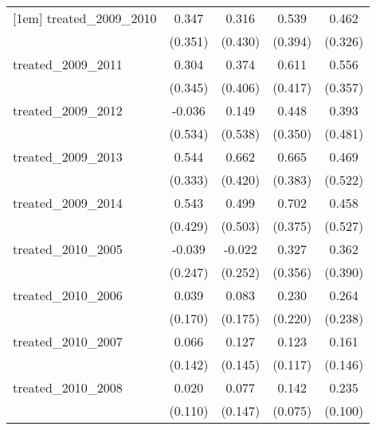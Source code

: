 {\begin{tabular}{l*{4}{c}}
[1em]
treated\_2009\_2010&       0.347         &       0.316         &       0.539         &       0.462         \\
            &     (0.351)         &     (0.430)         &     (0.394)         &     (0.326)         \\
[1em]
treated\_2009\_2011&       0.304         &       0.374         &       0.611         &       0.556         \\
            &     (0.345)         &     (0.406)         &     (0.417)         &     (0.357)         \\
[1em]
treated\_2009\_2012&      -0.036         &       0.149         &       0.448         &       0.393         \\
            &     (0.534)         &     (0.538)         &     (0.350)         &     (0.481)         \\
[1em]
treated\_2009\_2013&       0.544         &       0.662         &       0.665         &       0.469         \\
            &     (0.333)         &     (0.420)         &     (0.383)         &     (0.522)         \\
[1em]
treated\_2009\_2014&       0.543         &       0.499         &       0.702         &       0.458         \\
            &     (0.429)         &     (0.503)         &     (0.375)         &     (0.527)         \\
[1em]
treated\_2010\_2005&      -0.039         &      -0.022         &       0.327         &       0.362         \\
            &     (0.247)         &     (0.252)         &     (0.356)         &     (0.390)         \\
[1em]
treated\_2010\_2006&       0.039         &       0.083         &       0.230         &       0.264         \\
            &     (0.170)         &     (0.175)         &     (0.220)         &     (0.238)         \\
[1em]
treated\_2010\_2007&       0.066         &       0.127         &       0.123         &       0.161         \\
            &     (0.142)         &     (0.145)         &     (0.117)         &     (0.146)         \\
[1em]
treated\_2010\_2008&       0.020         &       0.077         &       0.142         &       0.235\sym{*}  \\
            &     (0.110)         &     (0.147)         &     (0.075)         &     (0.100)         \\

\end{tabular}}
